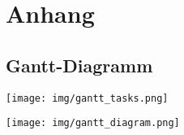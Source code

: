 \appendix

\chapter{Anhang}
\label{ch:Anhang}

\section*{Gantt-Diagramm}
\label{app:Gantt-Diagramm}


\begin{center}
\texttt{[image: img/gantt\_tasks.png]}
\end{center}

\newpage

\begin{center}
\texttt{[image: img/gantt\_diagram.png]}
\end{center}
